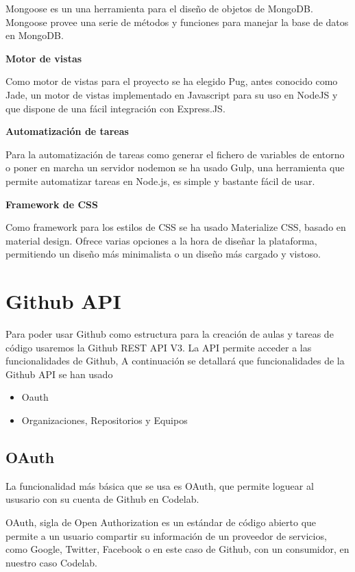 Mongoose es un una herramienta para el diseño de objetos de MongoDB. 
Mongoose provee una serie de métodos y funciones para manejar la base de datos en MongoDB.

{\bf Motor de vistas}

Como motor de vistas para el proyecto se ha elegido Pug, antes conocido como Jade, un motor de vistas implementado en Javascript para su uso en NodeJS y que dispone de una fácil integración con Express.JS. 

{\bf Automatización de tareas}

Para la automatización de tareas como generar el fichero de variables de entorno o poner en marcha un servidor nodemon se ha usado Gulp, una herramienta que permite automatizar tareas en Node.js, es simple y bastante fácil de usar.

{\bf Framework de CSS}

Como framework para los estilos de CSS se ha usado Materialize CSS, basado en material design. Ofrece varias opciones a la hora de diseñar la plataforma, permitiendo un diseño más minimalista o un diseño más cargado y vistoso.

\section{Github API}
\label{3:sec2}

Para poder usar Github como estructura para la creación de aulas y tareas de código usaremos la Github REST API V3.
La API permite acceder a las funcionalidades de Github, A continuación se detallará que funcionalidades de la Github API se han usado

\begin{itemize}
  \item Oauth
  \item Organizaciones, Repositorios y Equipos
\end{itemize}

\subsection{OAuth}
\label{3:2:1}

La funcionalidad más básica que se usa es OAuth, que permite loguear al ususario con su cuenta de Github en
Codelab.

OAuth, sigla de Open Authorization es un estándar de código abierto que permite a un usuario compartir su información de un proveedor de servicios, como Google, Twitter, Facebook o en este caso de Github, con un consumidor, en nuestro caso Codelab.

